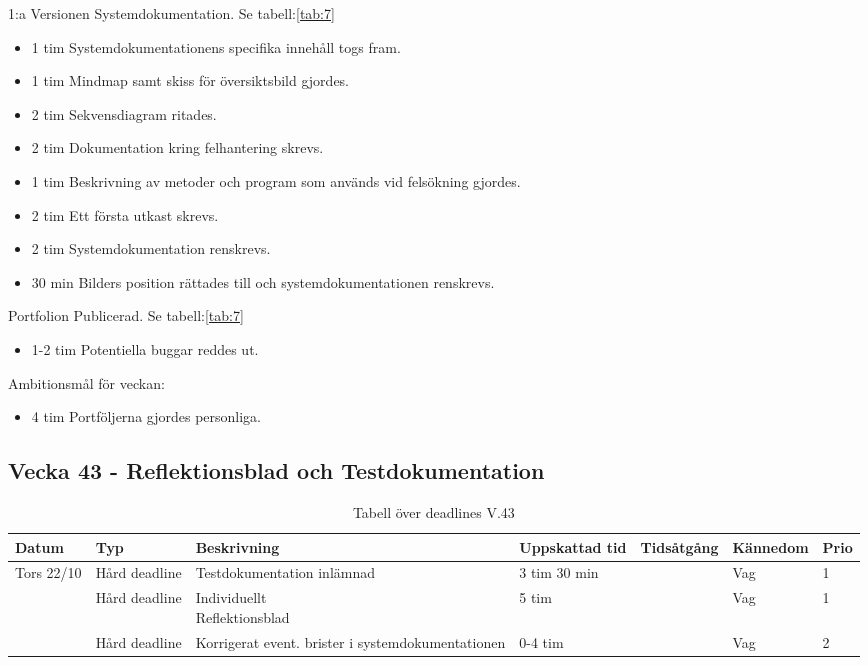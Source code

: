 \documentclass{TDP003mall}
\begin{document}
1:a Versionen Systemdokumentation. Se tabell:\ref{tab:7}
\begin{itemize}
  \item 1 tim Systemdokumentationens specifika innehåll togs fram.
  \item 1 tim Mindmap samt skiss för översiktsbild gjordes.
  \item 2 tim Sekvensdiagram ritades.
  \item 2 tim Dokumentation kring felhantering skrevs.
  \item 1 tim Beskrivning av metoder och program som används vid felsökning gjordes.
  \item 2 tim Ett första utkast skrevs.
  \item 2 tim Systemdokumentation renskrevs.
  \item 30 min Bilders position rättades till och systemdokumentationen renskrevs.
\end{itemize}

Portfolion Publicerad. Se tabell:\ref{tab:7}
\begin{itemize}
\item 1-2 tim Potentiella buggar reddes ut.
  \end{itemize}

Ambitionsmål för veckan:
\begin{itemize}
\item 4 tim Portföljerna gjordes personliga.
\end{itemize}



\subsection*{Vecka 43 - Reflektionsblad och Testdokumentation}
\begin{table}[h!]
  
\begin{tabularx}{\linewidth}{|l|l|X|l|l|l|l|}
  \hline
  Datum      & Typ           & Beskrivning                                       & Uppskattad tid & Tidsåtgång & Kännedom & Prio \\ [0.5ex]
  \hline                                                                             
  Tors 22/10 & Hård deadline & Testdokumentation inlämnad                        & 3 tim 30 min   &            & Vag      & 1\\
  \hline                                                                             
             & Hård deadline & \makecell[tl]{Individuellt \\ Reflektionsblad}    & 5 tim          &            & Vag      & 1\\
  \hline                                                                             
             & Hård deadline & Korrigerat event. brister i systemdokumentationen & 0-4 tim        &            & Vag      & 2\\
  \hline
\end{tabularx}
      \caption{Tabell över deadlines V.43\label{tab:8}}
      \end{table}
\end{document}
